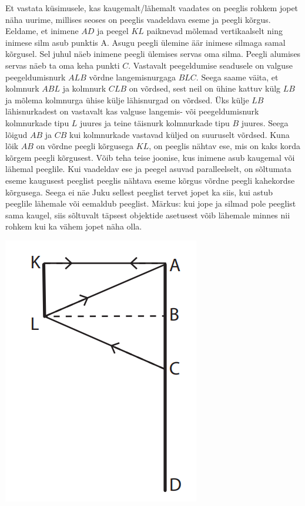 \documentclass[11pt]{article}
\begin{document}
{{\ifSolution
Et vastata küsimusele, kas kaugemalt/lähemalt vaadates on peeglis rohkem jopet näha uurime, millises seoses on peeglis vaadeldava eseme ja peegli kõrgus. \\
Eeldame, et inimene $AD$ ja peegel $KL$ paiknevad mõlemad vertikaalselt ning inimese silm asub punktis A. 
Asugu peegli ülemine äär inimese silmaga samal kõrgusel. Sel juhul näeb inimene peegli ülemises servas oma silma. Peegli alumises servas näeb ta oma keha punkti $C$. 
Vastavalt peegeldumise seadusele on valguse peegeldumisnurk $ALB$ võrdne langemisnurgaga $BLC$. 
Seega saame väita, et kolmnurk $ABL$ ja kolmnurk $CLB$ on võrdsed, sest neil on ühine kattuv külg $LB$ ja mõlema kolmnurga ühise külje lähisnurgad on võrdsed. Üks külje $LB$ lähisnurkadest on vastavalt kas valguse langemis- või peegeldumisnurk kolmnurkade tipu $L$ juures ja teine täisnurk kolmnurkade tipu $B$ juures. 
Seega lõigud $AB$ ja $CB$ kui kolmnurkade vastavad küljed on suuruselt võrdsed. 
Kuna lõik $AB$ on võrdne peegli kõrgusega $KL$, on peeglis nähtav ese, mis on kaks korda kõrgem peegli kõrgusest.
Võib teha teise joonise, kus inimene asub kaugemal või lähemal peeglile. Kui vaadeldav ese ja peegel asuvad paralleelselt, on sõltumata eseme kaugusest peeglist peeglis nähtava eseme kõrgus võrdne peegli kahekordse kõrgusega. Seega ei näe Juku sellest peeglist tervet jopet ka siis, kui astub peeglile lähemale või eemaldub peeglist. 
Märkus: kui jope ja silmad pole peeglist sama kaugel, siis sõltuvalt täpsest objektide asetusest võib lähemale minnes nii rohkem kui ka vähem jopet näha olla.
\begin{center}
	\includegraphics[width=0.5\linewidth]{2019-v2p-03-lah.PNG}
\end{center}
\fi
}


}
\end{document}
